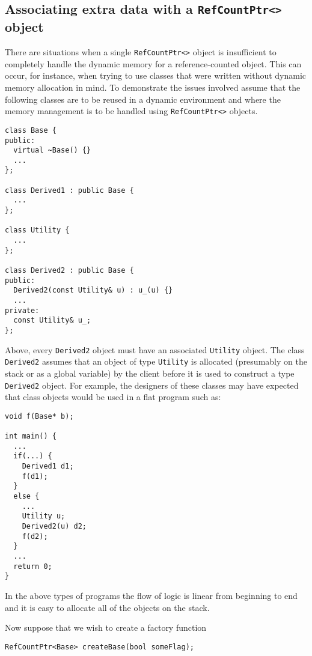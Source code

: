 %
\subsection{Associating extra data with a {}\texttt{RefCountPtr<>} object}
\label{rcp:sec:extra-data}
%

There are situations when a single {}\texttt{RefCountPtr<>} object is
insufficient to completely handle the dynamic memory for a
reference-counted object.  This can occur, for instance, when trying
to use classes that were written without dynamic memory allocation in
mind.  To demonstrate the issues involved assume that the following
classes are to be reused in a dynamic environment and where the memory
management is to be handled using {}\texttt{RefCountPtr<>} objects.

{\scriptsize\begin{verbatim}
class Base {
public:
  virtual ~Base() {}
  ...
};

class Derived1 : public Base {
  ...
};

class Utility {
  ...
};

class Derived2 : public Base {
public:
  Derived2(const Utility& u) : u_(u) {}
  ...
private:
  const Utility& u_;
};
\end{verbatim}}

{}\noindent{}Above, every {}\texttt{Derived2} object must have an
associated {}\texttt{Utility} object.  The class {}\texttt{Derived2}
assumes that an object of type {}\texttt{Utility} is allocated
(presumably on the stack or as a global variable) by the client before
it is used to construct a type {}\texttt{Derived2} object.  For
example, the designers of these classes may have expected that class
objects would be used in a flat program such as:

{\scriptsize\begin{verbatim}
void f(Base* b);

int main() {
  ...
  if(...) {
    Derived1 d1;
    f(d1);
  }
  else {
    ...
    Utility u;
    Derived2(u) d2;
    f(d2);
  }
  ...
  return 0;
}
\end{verbatim}}

{}\noindent{}In the above types of programs the flow of logic is
linear from beginning to end and it is easy to allocate all of the
objects on the stack.

Now suppose that we wish to create a factory function

{\scriptsize\begin{verbatim}
RefCountPtr<Base> createBase(bool someFlag);
\end{verbatim}}

